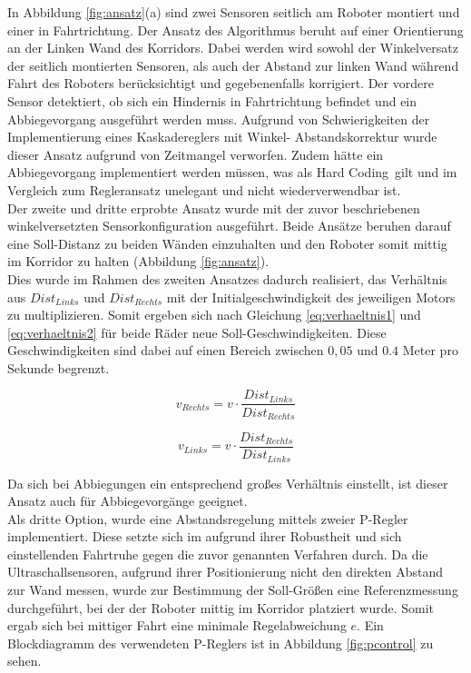 \documentclass[12pt,a4paper,oneside]{article}
\begin{document}
\begin{spacing}{1.15}
In Abbildung \ref{fig:ansatz}(a) sind zwei Sensoren seitlich am Roboter montiert und einer in Fahrtrichtung. Der Ansatz des Algorithmus beruht auf einer Orientierung an der Linken Wand des Korridors. Dabei werden wird sowohl der Winkelversatz der seitlich montierten Sensoren, als auch der Abstand zur linken Wand während Fahrt des Roboters berücksichtigt und gegebenenfalls korrigiert. Der vordere Sensor detektiert, ob sich ein Hindernis in Fahrtrichtung befindet und ein Abbiegevorgang ausgeführt werden muss. Aufgrund von Schwierigkeiten der Implementierung eines Kaskadereglers mit Winkel- Abstandskorrektur wurde dieser Ansatz aufgrund von Zeitmangel verworfen. Zudem hätte ein Abbiegevorgang implementiert werden müssen, was als \glqq Hard Coding\grqq \ gilt und im Vergleich zum Regleransatz unelegant und nicht wiederverwendbar ist.\\
Der zweite und dritte erprobte Ansatz wurde mit der zuvor beschriebenen winkelversetzten Sensorkonfiguration ausgeführt. Beide Ansätze beruhen darauf eine Soll-Distanz zu beiden Wänden einzuhalten und den Roboter somit mittig im Korridor zu halten (Abbildung \ref{fig:ansatz}). \\
Dies wurde im Rahmen des zweiten Ansatzes dadurch realisiert, das Verhältnis aus $Dist_{Links}$ und $Dist_{Rechts}$ mit der Initialgeschwindigkeit des jeweiligen Motors zu multiplizieren. Somit ergeben sich nach Gleichung \ref{eq:verhaeltnis1} und \ref{eq:verhaeltnis2} für beide Räder neue Soll-Geschwindigkeiten. Diese Geschwindigkeiten sind dabei auf einen Bereich zwischen $0,05$ und $0.4$ Meter pro Sekunde begrenzt.

\begin{center}
	\begin{equation}
	v_{Rechts} = v \cdot \frac{Dist_{Links}}{Dist_{Rechts}}
	\label{eq:verhaeltnis1}
	\end{equation}
\end{center}

\begin{center}
	\begin{equation}
	v_{Links} = v \cdot \frac{Dist_{Rechts}}{Dist_{Links}}
	\label{eq:verhaeltnis2}
	\end{equation}
\end{center} 

Da sich bei Abbiegungen ein entsprechend großes Verhältnis einstellt, ist dieser Ansatz auch für Abbiegevorgänge geeignet. \\
Als dritte Option, wurde eine Abstandsregelung mittels zweier P-Regler implementiert. Diese setzte sich im aufgrund ihrer Robustheit und sich einstellenden Fahrtruhe gegen die zuvor genannten Verfahren durch. Da die Ultraschallsensoren, aufgrund ihrer Positionierung nicht den direkten Abstand zur Wand messen, wurde zur Bestimmung der Soll-Größen eine Referenzmessung durchgeführt, bei der der Roboter mittig im Korridor platziert wurde. Somit ergab sich bei mittiger Fahrt eine minimale Regelabweichung $e$. Ein Blockdiagramm des verwendeten P-Reglers ist in Abbildung \ref{fig:pcontrol} zu sehen.\\


\end{spacing}
\end{document}
